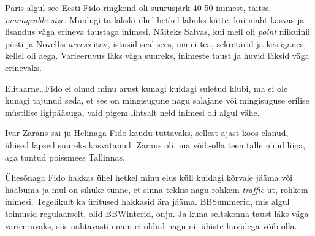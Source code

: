 Päris algul see Eesti Fido ringkond oli suurusjärk 40-50 inimest, täitsa 
\emph{manageable size}. Muidugi ta läkski ühel hetkel  läbuks kätte, kui 
maht kasvas ja lisandus väga erineva taustaga inimesi. Näiteks Salvas, kui meil 
oli \emph{point} niikuinii püsti ja Novellis \emph{access}-itav, istusid seal sees, ma 
ei tea, sekretärid ja kes iganes, kellel oli aega. Varieeruvus läks väga 
suureks, inimeste taust ja huvid läksid väga erinevaks. 


Elitaarne\ldots Fido ei olnud minu arust kunagi kuidagi suletud klubi,  ma ei ole 
kunagi tajunud seda, et see on mingisugune nagu salajane või mingisuguse 
erilise müstilise ligipääsuga, vaid pigem lihtsalt neid inimesi oli algul vähe. 

Ivar Zarans sai ju Helinaga 
Fido kaudu tuttavaks, sellest ajast koos elanud, ühised lapsed suureks 
kasvatanud. Zarans oli, ma võib-olla teen talle nüüd liiga, aga tuntud 
poissmees Tallinnas. 

Ühesõnaga Fido hakkas ühel hetkel minu elus küll kuidagi kõrvale jääma või 
hääbuma ja mul on sihuke tunne, et sinna tekkis nagu rohkem \emph{traffic}-ut, 
rohkem inimesi. Tegelikult ka  üritused hakkasid ära jääma. BBSummerid, 
mis algul toimusid regulaarselt, olid BBWinterid, onju. Ja kuna  seltskonna 
taust  läks väga varieeruvaks, siis nähtavasti enam ei oldud nagu nii ühiste 
huvidega võib olla. 


